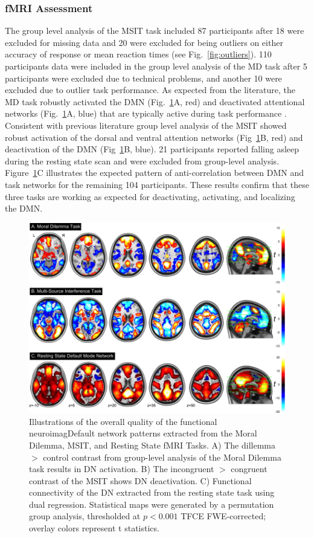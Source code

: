 \subsubsection{fMRI Assessment}
The group level analysis of the MSIT task included 87 participants after 18 were excluded for missing data and 20 were excluded for being outliers on either accuracy of response or mean reaction times (see Fig.~\ref{fig:outliers}). 110 participants data were included in the group level analysis of the MD task after 5 participants were excluded due to technical problems, and another 10 were excluded due to outlier task performance. As expected from the literature, the MD task robustly activated the DMN (Fig.~\ref{fig:tfmri_plots}A, red) and deactivated attentional networks (Fig.~\ref{fig:tfmri_plots}A, blue) that are typically active during task performance \cite{Harrison2008}. Consistent with previous literature \cite{Bush2003} group level analysis of the MSIT showed robust activation of the dorsal and ventral attention networks (Fig~\ref{fig:tfmri_plots}B, red) and deactivation of the DMN (Fig~\ref{fig:tfmri_plots}B, blue). 21 participants reported falling asleep during the resting state scan and were excluded from group-level analysis. Figure~\ref{fig:tfmri_plots}C illustrates the expected pattern of anti-correlation between DMN and task networks \cite{Fox2005} for the remaining 104 participants. These results confirm that these three tasks are working as expected for deactivating, activating, and localizing the DMN.

\begin{figure}[h!]
   \centering
   \includegraphics[width=.9\textwidth]{tfmri_plots.png}
   \caption{Illustrations of the overall quality of the functional neuroimagDefault network patterns extracted from the Moral Dilemma, MSIT, and Resting State fMRI Tasks. A) The dillemma $>$ control contrast from group-level analysis of the Moral Dilemma task results in DN activation. B) The incongruent $>$ congruent contrast of the MSIT shows DN deactivation. C) Functional connectivity of the DN extracted from the resting state task using dual regression. Statistical maps were generated by a permutation group analysis, thresholded at $p < 0.001$ TFCE FWE-corrected; overlay colors represent t statistics.}
   \label{fig:tfmri_plots}
\end{figure}

